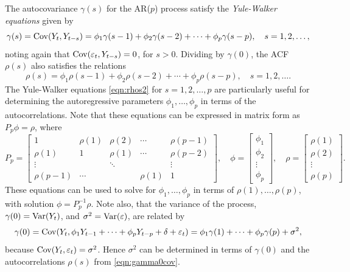 The autocovariance $\gamma(s)$ for the AR($p$) process satisfy the \emph{Yule-Walker equations} given by
	\begin{equation*}
	\gamma(s)= \operatorname{Cov}(Y_t,Y_{t-s}) = \phi_1 \gamma(s-1) + \phi_2 \gamma(s-2) + \cdots + \phi_p \gamma(s-p), \quad s= 1,2,\ldots,
	\end{equation*}
noting again that $\operatorname{Cov}(\varepsilon_t,Y_{t-s})= 0$, for $s > 0$. Dividing by $\gamma(0)$, the ACF $\rho(s)$ also satisfies the relations
	\begin{equation} \label{eqn:rhos2}
	\rho(s) = \phi_1 \rho(s-1) + \phi_2 \rho(s-2) + \cdots + \phi_p \rho(s-p), \quad s= 1,2,\ldots.
	\end{equation}
The Yule-Walker equations \eqref{eqn:rhos2} for $s= 1, 2, \ldots, p$ are particularly useful for determining the autoregressive parameters $\phi_1, \ldots, \phi_p$ in terms of the autocorrelations. Note that these equations can be expressed in matrix form as $P_p \phi = \rho$, where
	\begin{equation} \label{eqn:matrix}
	P_p = 
	\begin{bmatrix}
	1 & \rho(1) & \rho(2) & \cdots & \rho(p-1) \\
	\rho(1) & 1 & \rho(1) & \cdots & \rho(p-2)\\
	\vdots & & \ddots & & \vdots \\
	\rho(p-1) & \cdots & & \rho(1) & 1
	\end{bmatrix}, \quad
	\phi= \begin{bmatrix} \phi_1 \\ \phi_2 \\ \vdots \\ \phi_p \end{bmatrix}, \quad
	\rho= \begin{bmatrix} \rho(1) \\ \rho(2) \\ \vdots \\ \rho(p) \end{bmatrix}.
	\end{equation}
These equations can be used to solve for $\phi_1, \ldots, \phi_p$ in terms of $\rho(1), \ldots, \rho(p)$, with solution $\phi = P_p^{-1} \rho$. Note also, that the variance of the process, $\gamma(0) = \operatorname{Var}(Y_t)$, and $\sigma^2= \operatorname{Var}(\varepsilon)$, are related by
	\begin{equation} \label{eqn:gamma0cov}
	\gamma(0)= \cov(Y_t, \phi_1 Y_{t-1} + \cdots + \phi_p Y_{t-p} + \delta + \varepsilon_t)= \phi_1 \gamma(1) + \cdots + \phi_p \gamma(p) + \sigma^2,
	\end{equation}
because $\operatorname{Cov}(Y_t, \varepsilon_t)= \sigma^2$. Hence $\sigma^2$ can be determined in terms of $\gamma(0)$ and the autocorrelations $\rho(s)$ from \eqref{eqn:gamma0cov}.


